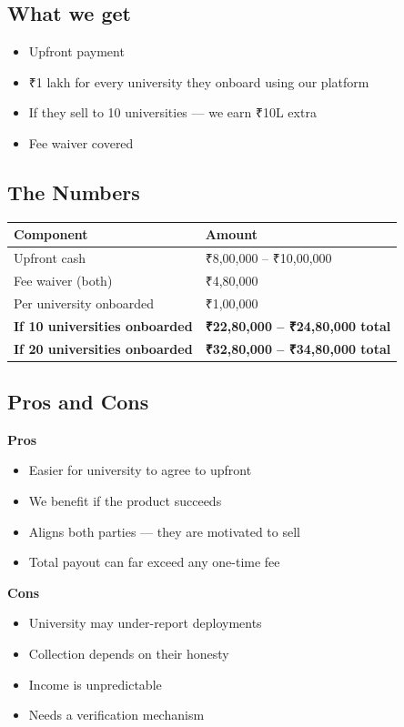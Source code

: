 \documentclass[12pt,a4paper]{article}
\begin{document}
    \subsection*{What we get}
    \begin{itemize}[leftmargin=*, noitemsep]
        \item Upfront payment
        \item ₹1 lakh for every university they onboard using our platform
        \item If they sell to 10 universities — we earn ₹10L extra
        \item Fee waiver covered
    \end{itemize}

    \subsection*{The Numbers}

    \begin{tabularx}{\textwidth}{L{5cm} X}
    \toprule
    \textbf{Component} & \textbf{Amount} \\
    \midrule
    Upfront cash & ₹8,00,000 – ₹10,00,000 \\
    Fee waiver (both) & ₹4,80,000 \\
    Per university onboarded & ₹1,00,000 \\
    \textbf{If 10 universities onboarded} & \textbf{₹22,80,000 – ₹24,80,000 total} \\
    \textbf{If 20 universities onboarded} & \textbf{₹32,80,000 – ₹34,80,000 total} \\
    \bottomrule
    \end{tabularx}

    \subsection*{Pros and Cons}

    \begin{multicols}{2}
    \textbf{\color{green} Pros}
    \begin{itemize}[leftmargin=*, noitemsep]
        \item Easier for university to agree to upfront
        \item We benefit if the product succeeds
        \item Aligns both parties — they are motivated to sell
        \item Total payout can far exceed any one-time fee
    \end{itemize}

    \columnbreak

    \textbf{\color{red} Cons}
    \begin{itemize}[leftmargin=*, noitemsep]
        \item University may under-report deployments
        \item Collection depends on their honesty
        \item Income is unpredictable
        \item Needs a verification mechanism
    \end{itemize}
    \end{multicols}
\end{document}

